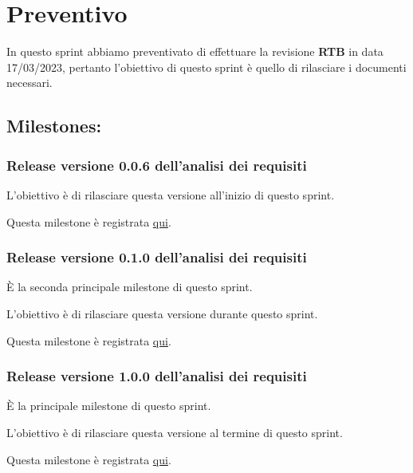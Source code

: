 \section{Preventivo}

In questo sprint abbiamo preventivato di effettuare la revisione \textbf{RTB} in data 17/03/2023, pertanto l'obiettivo di questo sprint è quello di rilasciare i documenti necessari.

\subsection{Milestones:}  
\subsubsection{Release versione 0.0.6 dell'analisi dei requisiti}

L'obiettivo è di rilasciare questa versione all'inizio di questo sprint.

Questa milestone è registrata \href{https://github.com/SWEasabi/analisi-dei-requisiti/milestone/6}{qui}.

\subsubsection{Release versione 0.1.0 dell'analisi dei requisiti}

È la seconda principale milestone di questo sprint.

L'obiettivo è di rilasciare questa versione durante questo sprint.

Questa milestone è registrata \href{hhttps://github.com/SWEasabi/analisi-dei-requisiti/milestone/8}{qui}.

\subsubsection{Release versione 1.0.0 dell'analisi dei requisiti}

È la principale milestone di questo sprint.

L'obiettivo è di rilasciare questa versione al termine di questo sprint.

Questa milestone è registrata \href{https://github.com/SWEasabi/analisi-dei-requisiti/milestone/7}{qui}.